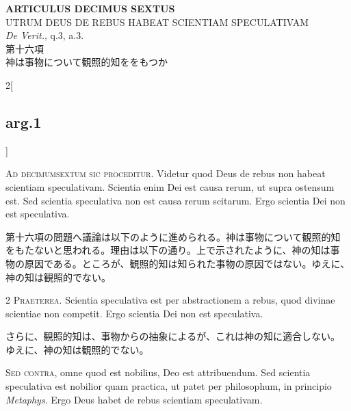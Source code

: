\documentclass[paper=a4paper,fontsize=10pt,jafontsize=9pt,titlepage]{jlreq}
\begin{document}
\newpage




{}
\setcounter{section}{16}
\setcounter{subsection}{0}
\begin{center}
{\Large {\bfseries ARTICULUS DECIMUS SEXTUS}}\\ {\large UTRUM DEUS DE REBUS
HABEAT SCIENTIAM SPECULATIVAM}\\ {\footnotesize {\itshape De Verit.},
q.3, a.3.}\\ {\Large 第十六項\\神は事物について観照的知ををもつか}
\end{center}



\begin{paracol}{2}[\subsection{arg.1}]

{\huge A}{\scshape d decimumsextum sic proceditur}. Videtur quod Deus
de rebus non habeat scientiam speculativam. Scientia enim Dei est
causa rerum, ut supra ostensum est. Sed scientia speculativa non est
causa rerum scitarum. Ergo scientia Dei non est speculativa.

\switchcolumn

第十六項の問題へ議論は以下のように進められる。神は事物について観照的知
をもたないと思われる。理由は以下の通り。上で示されたように、神の知は事
物の原因である。ところが、観照的知は知られた事物の原因ではない。ゆえに、
神の知は観照的でない。


{\scshape 2 Praeterea}. Scientia speculativa est per abstractionem a
rebus, quod divinae scientiae non competit. Ergo scientia Dei non est
speculativa.

\switchcolumn

さらに、観照的知は、事物からの抽象によるが、これは神の知に適合しない。
ゆえに、神の知は観照的でない。

\switchcolumn*[\subsection{s.c.}]

{\scshape Sed contra}, omne quod est nobilius, Deo est
attribuendum. Sed scientia speculativa est nobilior quam practica, ut
patet per philosophum, in principio {\itshape Metaphys}. Ergo Deus
habet de rebus scientiam speculativam.


\end{paracol}
\end{document}
